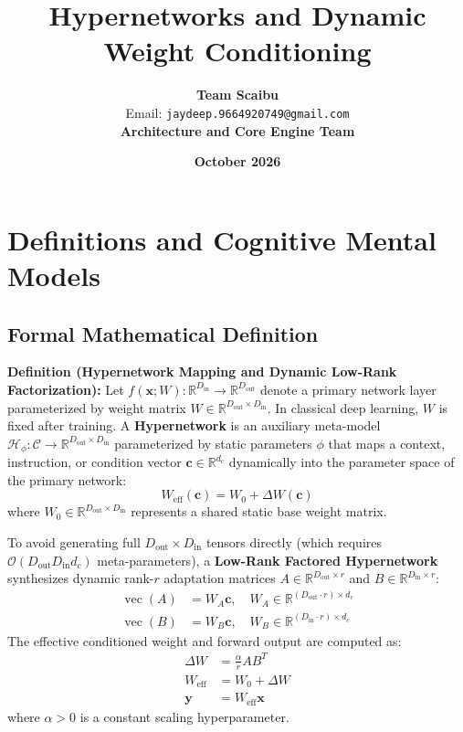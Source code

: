 \documentclass[11pt,a4paper]{article}
\title{\textbf{Hypernetworks and Dynamic Weight Conditioning}}
\author{\textbf{Team Scaibu} \\ \small Email: \texttt{jaydeep.9664920749@gmail.com} \\ \small \textbf{Architecture and Core Engine Team}}
\date{\textbf{October 2026}}
\theoremstyle{definition}
\begin{document}
\maketitle

\section{Definitions and Cognitive Mental Models}

\subsection{Formal Mathematical Definition}
\textbf{Definition (Hypernetwork Mapping and Dynamic Low-Rank Factorization):}
Let $f(\mathbf{x}; W): \mathbb{R}^{D_{\text{in}}} \to \mathbb{R}^{D_{\text{out}}}$ denote a primary network layer parameterized by weight matrix $W \in \mathbb{R}^{D_{\text{out}} \times D_{\text{in}}}$. In classical deep learning, $W$ is fixed after training. A \textbf{Hypernetwork} is an auxiliary meta-model $\mathcal{H}_\phi: \mathcal{C} \to \mathbb{R}^{D_{\text{out}} \times D_{\text{in}}}$ parameterized by static parameters $\phi$ that maps a context, instruction, or condition vector $\mathbf{c} \in \mathbb{R}^{d_c}$ dynamically into the parameter space of the primary network:
{\boldmath
\begin{equation}
W_{\text{eff}}(\mathbf{c}) = W_0 + \Delta W(\mathbf{c})
\end{equation}
}
where $W_0 \in \mathbb{R}^{D_{\text{out}} \times D_{\text{in}}}$ represents a shared static base weight matrix.

To avoid generating full $D_{\text{out}} \times D_{\text{in}}$ tensors directly (which requires $\mathcal{O}(D_{\text{out}} D_{\text{in}} d_c)$ meta-parameters), a \textbf{Low-Rank Factored Hypernetwork} synthesizes dynamic rank-$r$ adaptation matrices $A \in \mathbb{R}^{D_{\text{out}} \times r}$ and $B \in \mathbb{R}^{D_{\text{in}} \times r}$:
{\boldmath
\begin{align}
\operatorname{vec}(A) &= W_A \mathbf{c}, \quad W_A \in \mathbb{R}^{(D_{\text{out}} \cdot r) \times d_c} \\
\operatorname{vec}(B) &= W_B \mathbf{c}, \quad W_B \in \mathbb{R}^{(D_{\text{in}} \cdot r) \times d_c}
\end{align}
}
The effective conditioned weight and forward output are computed as:
{\boldmath
\begin{align}
\Delta W &= \frac{\alpha}{r} A B^T \\
W_{\text{eff}} &= W_0 + \Delta W \\
\mathbf{y} &= W_{\text{eff}} \mathbf{x}
\end{align}
}
where $\alpha > 0$ is a constant scaling hyperparameter.
\end{document}
